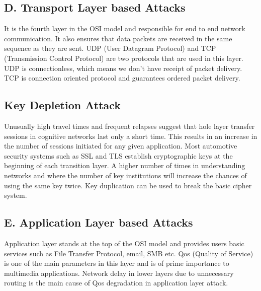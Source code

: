 \documentclass{article}
\begin{document}
\subsection{D. Transport Layer based Attacks}
It is the fourth layer in the OSI model and responsible for
end to end network communication. It also ensures that data
packets are received in the same sequence as they are sent.
UDP (User Datagram Protocol) and TCP (Transmission
Control Protocol) are two protocols that are used in this
layer. UDP is connectionless, which means we don’t have
receipt of packet delivery. TCP is connection oriented
protocol and guarantees ordered packet delivery.
\newline

\subsection{Key Depletion Attack}
Unusually high travel times and frequent relapses suggest
that hole layer transfer sessions in cognitive networks last
only a short time. This results in an increase in the number
of sessions initiated for any given application. Most
automotive security systems such as SSL and TLS establish
cryptographic keys at the beginning of each transition layer.
A higher number of times in understanding networks and
where the number of key institutions will increase the
chances of using the same key twice. Key duplication can
be used to break the basic cipher system.

\newline

\subsection{ E. Application Layer based Attacks}
Application layer stands at the top of the OSI model and
provides users basic services such as File Transfer Protocol,
email, SMB etc. Qos (Quality of Service) is one of the main
parameters in this layer and is of prime importance to
multimedia applications. Network delay in lower layers due
to unnecessary routing is the main cause of Qos degradation
in application layer attack.
\newline
\end{document}
